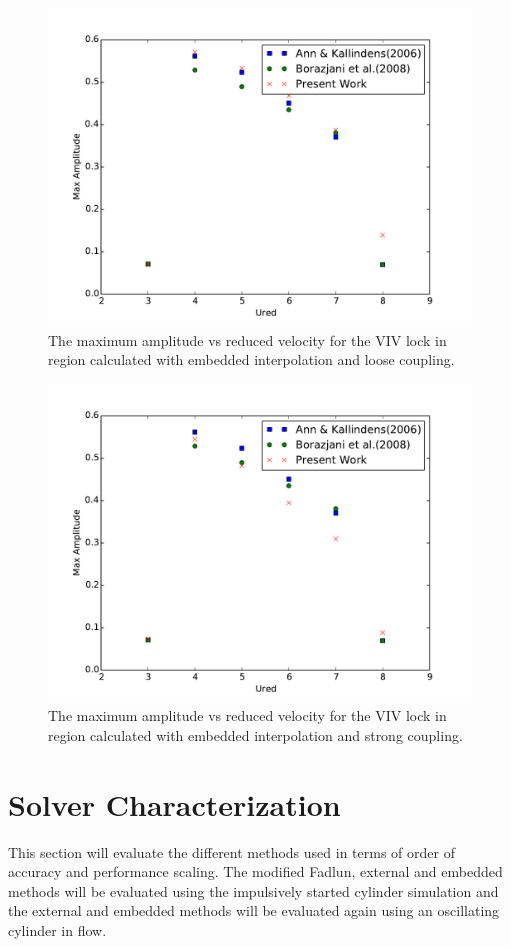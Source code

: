 \begin{figure}
	\centering
	\includegraphics[width=\textwidth]{vivemlc}
	\caption{The maximum amplitude vs reduced velocity for the VIV lock in region calculated with embedded interpolation and loose coupling.}
	\label{fig:viv3}
\end{figure}
\begin{figure}
	\centering
	\includegraphics[width=\textwidth]{vivemsc}
	\caption{The maximum amplitude vs reduced velocity for the VIV lock in region calculated with embedded interpolation and strong coupling.}
	\label{fig:viv4}
\end{figure}

\chapter{Solver Characterization}
\label{chapter:error}
This section will evaluate the different methods used in terms of order of accuracy and performance scaling. 
The modified Fadlun, external and embedded methods will be evaluated using the impulsively started cylinder simulation and the external and embedded methods will be evaluated again using an oscillating cylinder in flow.

